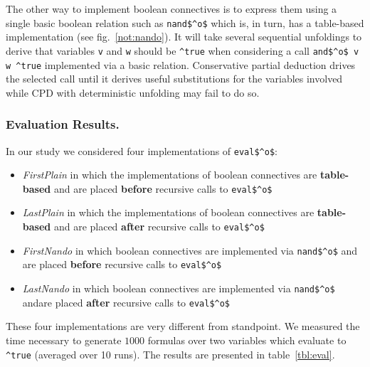 The other way to implement boolean connectives is to express them using a single basic boolean relation such as \lstinline{nand$^o$} which is, in turn, has a table-based
implementation (see fig.~\ref{not:nando}). It will take several sequential unfoldings to derive that variables \lstinline{v} and \lstinline{w} should
be \lstinline{^true} when considering a call \lstinline{and$^o$ v w ^true} implemented via a basic relation.
Conservative partial deduction drives the selected call until it derives useful substitutions for the variables involved while CPD with deterministic unfolding may fail to do so.

\subsubsection{Evaluation Results.}
In our study we considered four implementations of \lstinline{eval$^o$}:
\begin{itemize}
  \item \emph{FirstPlain} in which the implementations of boolean connectives are \textbf{table-based} and are placed \textbf{before} recursive calls to \lstinline{eval$^o$}
  \item \emph{LastPlain} in which the implementations of boolean connectives are \textbf{table-based} and are placed \textbf{after} recursive calls to \lstinline{eval$^o$}
  \item \emph{FirstNando} in which boolean connectives are implemented via \lstinline{nand$^o$} and are placed \textbf{before} recursive calls to \lstinline{eval$^o$}
  \item \emph{LastNando} in which boolean connectives are implemented via \lstinline{nand$^o$} andare placed \textbf{after} recursive calls to \lstinline{eval$^o$}

\end{itemize}

These four implementations are very different from \ecce standpoint.
We measured the time necessary to generate $1000$ formulas over two variables which evaluate to \lstinline{^true} (averaged over 10 runs).
The results are presented in table~\ref{tbl:eval}.

